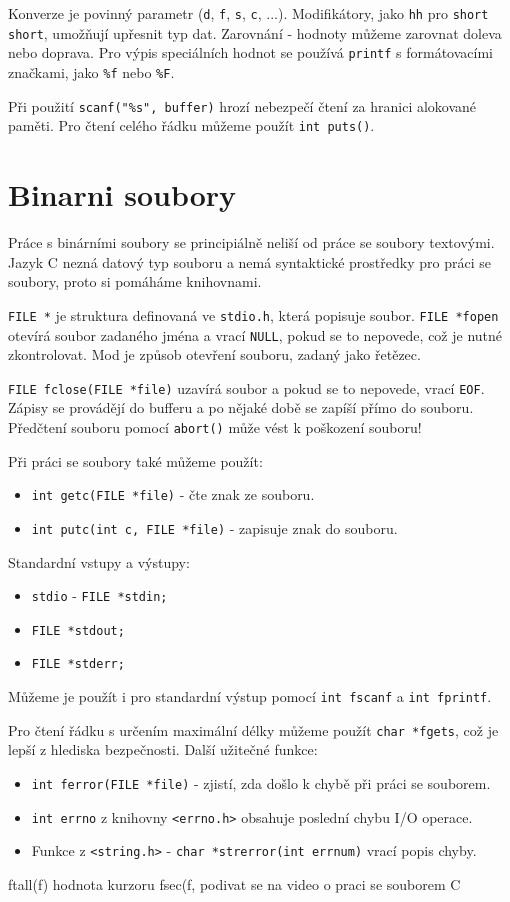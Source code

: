 \documentclass{article}
\begin{document}
Konverze je povinný parametr (\texttt{d}, \texttt{f}, \texttt{s}, \texttt{c}, ...).
Modifikátory, jako \texttt{hh} pro \texttt{short short}, umožňují upřesnit typ dat.
Zarovnání - hodnoty můžeme zarovnat doleva nebo doprava.
Pro výpis speciálních hodnot se používá \texttt{printf} s formátovacími značkami, jako \texttt{\%f} nebo \texttt{\%F}.

Při použití \texttt{scanf("\%s", buffer)} hrozí nebezpečí čtení za hranici alokované paměti.
Pro čtení celého řádku můžeme použít \texttt{int puts()}.

\section{Binarni soubory}

Práce s binárními soubory se principiálně neliší od práce se soubory textovými.
Jazyk C nezná datový typ souboru a nemá syntaktické prostředky pro práci se soubory, proto si pomáháme knihovnami.

\texttt{FILE *} je struktura definovaná ve \texttt{stdio.h}, která popisuje soubor.
\texttt{FILE *fopen} otevírá soubor zadaného jména a vrací \texttt{NULL}, pokud se to nepovede, což je nutné zkontrolovat.
Mod je způsob otevření souboru, zadaný jako řetězec.

\texttt{FILE fclose(FILE *file)} uzavírá soubor a pokud se to nepovede, vrací \texttt{EOF}.
Zápisy se provádějí do bufferu a po nějaké době se zapíší přímo do souboru.
Předčtení souboru pomocí \texttt{abort()} může vést k poškození souboru!

Při práci se soubory také můžeme použít:
\begin{itemize}
    \item \texttt{int getc(FILE *file)} - čte znak ze souboru.
    \item \texttt{int putc(int c, FILE *file)} - zapisuje znak do souboru.
\end{itemize}

Standardní vstupy a výstupy:
\begin{itemize}
    \item \texttt{stdio} - \texttt{FILE *stdin;}
    \item \texttt{FILE *stdout;}
    \item \texttt{FILE *stderr;}
\end{itemize}

Můžeme je použít i pro standardní výstup pomocí \texttt{int fscanf} a \texttt{int fprintf}.

Pro čtení řádku s určením maximální délky můžeme použít \texttt{char *fgets}, což je lepší z hlediska bezpečnosti.
Další užitečné funkce:
\begin{itemize}
    \item \texttt{int ferror(FILE *file)} - zjistí, zda došlo k chybě při práci se souborem.
    \item \texttt{int errno} z knihovny \texttt{<errno.h>} obsahuje poslední chybu I/O operace.
    \item Funkce z \texttt{<string.h>} - \texttt{char *strerror(int errnum)} vrací popis chyby.
\end{itemize}
ftall(f) hodnota kurzoru
fsec(f,
podivat se na video o praci se souborem C
\end{document}
